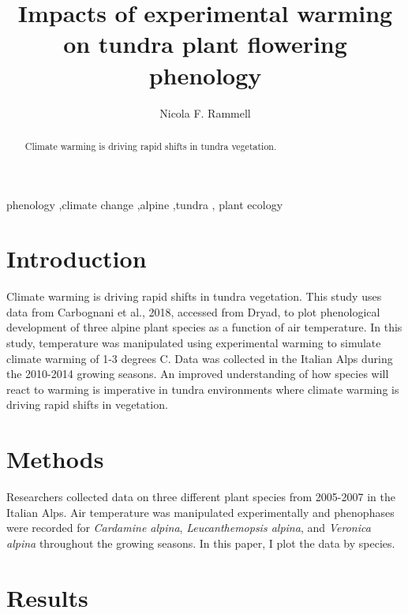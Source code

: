 \documentclass[preprint, 3p,
authoryear]{elsarticle} %
\begin{document}
\begin{frontmatter}

  \title{Impacts of experimental warming on tundra plant flowering
phenology}
    \author[The University of British Columbia]{Nicola F. Rammell%
  }
  
  \begin{abstract}
  Climate warming is driving rapid shifts in tundra vegetation.
  \end{abstract}
    \begin{keyword}
    phenology \sep climate change \sep alpine \sep tundra \sep 
    plant ecology
  \end{keyword}
  
 \end{frontmatter}

\hypertarget{introduction}{%
\section{Introduction}\label{introduction}}

Climate warming is driving rapid shifts in tundra vegetation. This study
uses data from Carbognani et al., 2018, accessed from Dryad, to plot
phenological development of three alpine plant species as a function of
air temperature. In this study, temperature was manipulated using
experimental warming to simulate climate warming of 1-3 degrees C. Data
was collected in the Italian Alps during the 2010-2014 growing seasons.
An improved understanding of how species will react to warming is
imperative in tundra environments where climate warming is driving rapid
shifts in vegetation.

\hypertarget{methods}{%
\section{Methods}\label{methods}}

Researchers collected data on three different plant species from
2005-2007 in the Italian Alps. Air temperature was manipulated
experimentally and phenophases were recorded for \emph{Cardamine
alpina}, \emph{Leucanthemopsis alpina}, and \emph{Veronica alpina}
throughout the growing seasons. In this paper, I plot the data by
species.

\hypertarget{results}{%
\section{Results}\label{results}}
\end{document}
